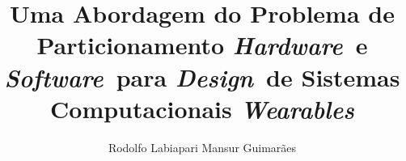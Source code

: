 \documentclass[bind,a4paper,table]{mythesis}
\newcommand{\Hardware }{\textit{Hardware}}
\newcommand{\Software }{\textit{Software}}
\newcommand{\Wearables}{\textit{Wearables}}
\newcommand{\Design}   {\textit{Design}}
\newcommand{\titulo}{Uma Abordagem do Problema de Particionamento \Hardware\ e \Software\ para \Design\ de Sistemas Computacionais \Wearables}
\begin{document}
\let\cleardoublepage\clearpage
\title{\titulo}
\author{Rodolfo Labiapari Mansur Guimarães}%

\begin{frontmatter}
	
\end{frontmatter}

\begin{mainmatter}
  	
	\let\cleardoublepage\clearpage
	
	
	
	
    
	
\end{mainmatter}

\begin{appendices}
\begin{flushleft}

\end{flushleft}
\end{appendices}
\let\cleardoublepage\clearpage
\begin{backmatter}
	
\end{backmatter}

\end{document}
